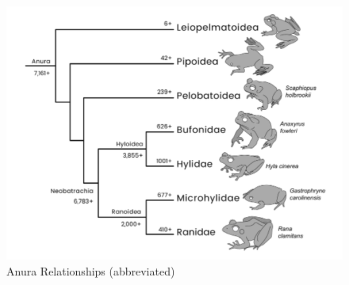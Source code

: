 \documentclass[a4paper,12pt]{article}
\begin{document}
\begin{description}
\begin{figure}[h]
\centering
  \includegraphics[scale=0.4]{Anura_tre.pdf}
  \caption{Anura Relationships (abbreviated)}
  \label{fig:Anura}
\end{figure}


\end{description}
\end{document}
